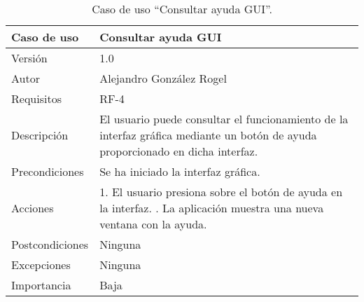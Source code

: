  \begin{table}
  \begin{center}
   \begin{tabular}{|>{} L{3cm} | L{9cm} |}
    \hline
    Caso de uso & Consultar ayuda GUI\\
    \hline
    Versión & 1.0 \\
    \hline
    Autor & Alejandro González Rogel \\
    \hline
    Requisitos & RF-4 \\
    \hline
    Descripción & El usuario puede consultar el funcionamiento de la interfaz gráfica mediante un botón de ayuda proporcionado en dicha interfaz.\\
    \hline
    Precondiciones & Se ha iniciado la interfaz gráfica. \\
    \hline
    Acciones & 1. El usuario presiona sobre el botón de ayuda en la interfaz. . La aplicación muestra una nueva ventana con la ayuda.\\
    \hline
    Postcondiciones & Ninguna \\
    \hline
    Excepciones & Ninguna \\
    \hline
    Importancia & Baja \\
    \hline
   \end{tabular}
   \caption{Caso de uso ``Consultar ayuda GUI''.}
   \label{tabla:casoUso4}
  \end{center}
 \end{table}
